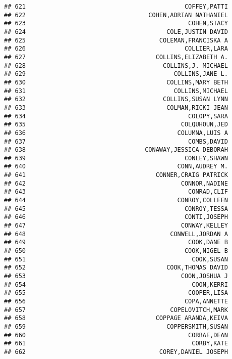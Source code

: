 \documentclass[
]{article}
\begin{document}
\begin{verbatim}
## 621                                            COFFEY,PATTI
## 622                                  COHEN,ADRIAN NATHANIEL
## 623                                             COHEN,STACY
## 624                                       COLE,JUSTIN DAVID
## 625                                     COLEMAN,FRANCISKA A
## 626                                            COLLIER,LARA
## 627                                    COLLINS,ELIZABETH A.
## 628                                      COLLINS,J. MICHAEL
## 629                                         COLLINS,JANE L.
## 630                                       COLLINS,MARY BETH
## 631                                         COLLINS,MICHAEL
## 632                                      COLLINS,SUSAN LYNN
## 633                                       COLMAN,RICKI JEAN
## 634                                             COLOPY,SARA
## 635                                           COLQUHOUN,JED
## 636                                          COLUMNA,LUIS A
## 637                                             COMBS,DAVID
## 638                                 CONAWAY,JESSICA DEBORAH
## 639                                            CONLEY,SHAWN
## 640                                          CONN,AUDREY M.
## 641                                    CONNER,CRAIG PATRICK
## 642                                           CONNOR,NADINE
## 643                                             CONRAD,CLIF
## 644                                          CONROY,COLLEEN
## 645                                            CONROY,TESSA
## 646                                            CONTI,JOSEPH
## 647                                           CONWAY,KELLEY
## 648                                        CONWELL,JORDAN A
## 649                                             COOK,DANE B
## 650                                            COOK,NIGEL B
## 651                                              COOK,SUSAN
## 652                                       COOK,THOMAS DAVID
## 653                                           COON,JOSHUA J
## 654                                              COON,KERRI
## 655                                             COOPER,LISA
## 656                                            COPA,ANNETTE
## 657                                        COPELOVITCH,MARK
## 658                                    COPPAGE ARANDA,KEIVA
## 659                                       COPPERSMITH,SUSAN
## 660                                             CORBAE,DEAN
## 661                                              CORBY,KATE
## 662                                     COREY,DANIEL JOSEPH

\end{verbatim}
\end{document}
